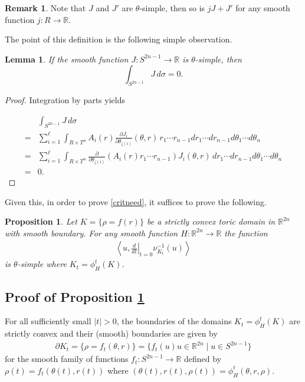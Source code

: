 \documentclass[12pt]{amsart}
\newtheorem{proposition}[theorem]{Proposition}
\newtheorem{lemma}[theorem]{Lemma}
\theoremstyle{definition}
\newtheorem{remark}[theorem]{Remark}
\newcommand{\RR}{{\mathbb R}}
\begin{document}
\begin{remark}\label{simple} Note that $J$ and $J'$ are $\theta$-simple, then so is $jJ+J'$ for any smooth function $j\colon R \to \RR.$ \end{remark}

The point of this definition is the following simple observation.

\begin{lemma}\label{simple0}
If the smooth function  $J \colon S^{2n-1} \to \RR$ is $\theta$-simple, then 
$$\int_{S^{2n-1}} J \, d\sigma =0.$$
\end{lemma}

\begin{proof}
    Integration by parts yields 


\begin{align*}
   & \int_{S^{2n-1}} J \, d\sigma\\=&\sum_{i=1}^{\ell}\int_{R \times T^n} A_i(r)\frac{\partial J_i}{\partial \theta_{\zeta(i)}}(\theta,r)\,r_1 \cdots r_{n-1}d r_1 \cdots d r_{n-1} d \theta_1 \cdots d \theta_n \\ =& \sum_{i=1}^{\ell}\int_{R \times T^n} \frac{\partial}{\partial \theta_{\zeta(i)}}\left(A_i(r)r_1 \cdots r_{n-1}\right) J_i(\theta,r)\,d r_1 \cdots d r_{n-1} d \theta_1 \cdots d \theta_n\\ =&0.
\end{align*}
\end{proof}
Given this, in order to prove \eqref{critneed}, it suffices to prove the following.

\begin{proposition}\label{form}
Let $K =\{\rho=f(r)\}$ be a strictly convex toric domain in $\RR^{2n}$ with smooth boundary. For any smooth function $H \colon \RR^{2n} \to \RR$ the function
\begin{align*}
\left\langle u, \left.\frac{d}{dt}\right|_{t=0} \nu^{-1}_{K_t}(u)\right\rangle
\end{align*}
is $\theta$-simple where $K_t =\phi^t_H(K)$.
\end{proposition}


\subsection{Proof of Proposition \ref{form}}
For all sufficiently small $|t|>0$, the boundaries of the domains $K_t =\phi^t_H(K)$ are strictly convex and their (smooth) boundaries are given by \begin{align*}
\partial K_t = \{\rho = f_t(\theta,r)\} = \{f_t(u)u \in \RR^{2n} \mid u \in S^{2n-1}\} 
\end{align*} for the smooth family of functions $f_t \colon S^{2n-1} \to \RR$ defined by $\rho(t) =f_t (\theta(t), r(t))$ where $(\theta(t),r(t),\rho(t)) =\phi^t_H(\theta,r,\rho)$.
\end{document}
